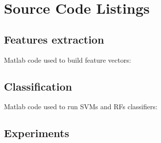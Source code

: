 \chapter{Source Code Listings}
\label{appendixB}
\thispagestyle{empty}


\section{Features extraction}

\label{appendixB:FE}
Matlab code used to build feature vectors:



\section{Classification}

\label{appendixB:Cl}
Matlab code used to run \Glspl{SVM} and \Glspl{RF} classifiers:



\section{Experiments}

\label{appendixB:exp1}
\label{appendixB:exp2}
\label{appendixB:exp3}
\label{appendixB:exp4}
\label{appendixB:exp5}
\label{appendixB:exp6}
\label{appendixB:exp7}

%